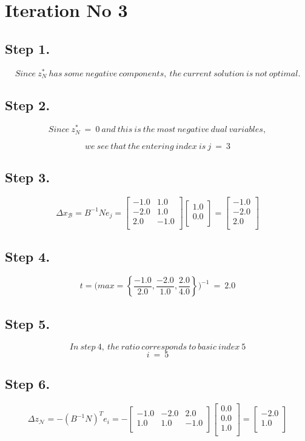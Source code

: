 \documentclass [12pt] {article}
\begin{document}
\section*{Iteration No 3}
\subsection{Step 1.}
\[
Since\ z_\mathit{N}^*\ has\ some\ negative\ components,\ the\ current\ solution\ is\ not\ optimal.
\]
\subsection{Step 2.}
\[
Since\ z_\mathit{N}^*\ = \ 0\ and\ this\ is\ the\ most\ negative\ dual\ variables,
\]

\[
we\ see\ that\ the\ entering\ index\ is\  j\ =\ 3
\]
\subsection{Step 3.}
\[
\Delta x_{\mathcal B} = B^{-1} N e_j =
\begin{bmatrix}
-1.0 & 1.0 \\ -2.0 & 1.0 \\ 2.0 & -1.0 \\ 
\end{bmatrix}
\begin{bmatrix}
1.0 \\ 0.0 \\ 
\end{bmatrix}
= \begin{bmatrix}
-1.0 \\ -2.0 \\ 2.0 \\ 
\end{bmatrix}
\]
\subsection{Step 4.}
\[
t =\Bigg(
max= \left\{\frac{-1.0}{2.0},\frac{-2.0}{1.0},\frac{2.0}{4.0}\right\}
\Bigg)^{-1}\ =\ 2.0
\]
\subsection{Step 5.}
\[
In\ step\ 4, \ the\ ratio\ corresponds\ to\ basic\ index\ 5
\]
\[
i\ = \ 5
\]
\subsection{Step 6.}
\[
\Delta z_{\mathcal N}= -( B^{-1} N )^{T}e_i = -\begin{bmatrix}
-1.0 & -2.0 & 2.0 \\ 1.0 & 1.0 & -1.0 \\ 
\end{bmatrix}
\begin{bmatrix}
0.0 \\ 0.0 \\ 1.0 \\ 
\end{bmatrix}
= \begin{bmatrix}
-2.0 \\ 1.0 \\ 
\end{bmatrix}
\]
\end{document}
